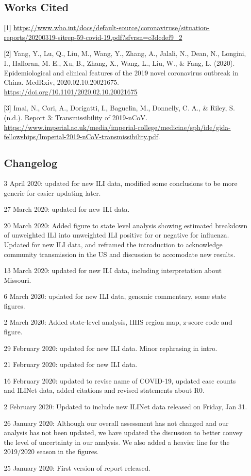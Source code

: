 \documentclass[]{article}
\begin{document}
\hypertarget{works-cited}{%
\subsection{Works Cited}\label{works-cited}}

{[}1{]}
\url{https://www.who.int/docs/default-source/coronaviruse/situation-reports/20200319-sitrep-59-covid-19.pdf?sfvrsn=c3dcdef9_2}

{[}2{]} Yang, Y., Lu, Q., Liu, M., Wang, Y., Zhang, A., Jalali, N.,
Dean, N., Longini, I., Halloran, M. E., Xu, B., Zhang, X., Wang, L.,
Liu, W., \& Fang, L. (2020). Epidemiological and clinical features of
the 2019 novel coronavirus outbreak in China. MedRxiv,
2020.02.10.20021675. \url{https://doi.org/10.1101/2020.02.10.20021675}

{[}3{]} Imai, N., Cori, A., Dorigatti, I., Baguelin, M., Donnelly, C.
A., \& Riley, S. (n.d.). Report 3: Transmissibility of 2019-nCoV.
\url{https://www.imperial.ac.uk/media/imperial-college/medicine/sph/ide/gida-fellowships/Imperial-2019-nCoV-transmissibility.pdf}.

\clearpage

\hypertarget{changelog}{%
\subsection{Changelog}\label{changelog}}

3 April 2020: updated for new ILI data, modified some conclusions to be
more generic for easier updating later.

27 March 2020: updated for new ILI data.

20 March 2020: Added figure to state level analysis showing estimated
breakdown of unweighted ILI into unweighted ILI positive for or negative
for influenza. Updated for new ILI data, and reframed the introduction
to acknowledge community transmission in the US and discussion to
accomodate new results.

13 March 2020: updated for new ILI data, including interpretation about
Missouri.

6 March 2020: updated for new ILI data, genomic commentary, some state
figures.

2 March 2020: Added state-level analysis, HHS region map, z-score code
and figure.

29 February 2020: updated for new ILI data. Minor rephrasing in intro.

21 February 2020: updated for new ILI data.

16 February 2020: updated to revise name of COVID-19, updated case
counts and ILINet data, added citations and revised statements about R0.

2 February 2020: Updated to include new ILINet data released on Friday,
Jan 31.

26 January 2020: Although our overall assessment has not changed and our
analysis has not been updated, we have updated the discussion to better
convey the level of uncertainty in our analysis. We also added a heavier
line for the 2019/2020 season in the figures.

25 January 2020: First version of report released.
\end{document}

